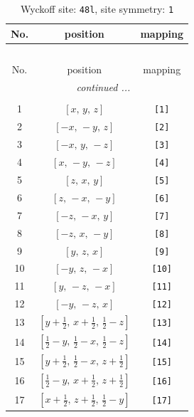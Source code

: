 \documentclass[fleqn,8pt]{jsarticle}
\begin{document}
\begin{longtable}{ccc}
\caption{Wyckoff site: {\tt 48l}, site symmetry: {\tt 1}}
 \\
 \hline \hline
No. & position & mapping \\ \hline \endfirsthead

\multicolumn{2}{l}{\tablename\ \thetable{}} \\
 \hline \hline
No. & position & mapping \\ \hline \endhead

 \hline \hline
\multicolumn{2}{r}{\footnotesize\it continued ...} \\ \endfoot

 \hline \hline
\multicolumn{2}{r}{} \\ \endlastfoot

1 & $\left[ x,\, y,\, z \right]$ & {\tt [1]} \\ \hline
2 & $\left[ - x,\, - y,\, z \right]$ & {\tt [2]} \\ \hline
3 & $\left[ - x,\, y,\, - z \right]$ & {\tt [3]} \\ \hline
4 & $\left[ x,\, - y,\, - z \right]$ & {\tt [4]} \\ \hline
5 & $\left[ z,\, x,\, y \right]$ & {\tt [5]} \\ \hline
6 & $\left[ z,\, - x,\, - y \right]$ & {\tt [6]} \\ \hline
7 & $\left[ - z,\, - x,\, y \right]$ & {\tt [7]} \\ \hline
8 & $\left[ - z,\, x,\, - y \right]$ & {\tt [8]} \\ \hline
9 & $\left[ y,\, z,\, x \right]$ & {\tt [9]} \\ \hline
10 & $\left[ - y,\, z,\, - x \right]$ & {\tt [10]} \\ \hline
11 & $\left[ y,\, - z,\, - x \right]$ & {\tt [11]} \\ \hline
12 & $\left[ - y,\, - z,\, x \right]$ & {\tt [12]} \\ \hline
13 & $\left[ y + \frac{1}{2},\, x + \frac{1}{2},\, \frac{1}{2} - z \right]$ & {\tt [13]} \\ \hline
14 & $\left[ \frac{1}{2} - y,\, \frac{1}{2} - x,\, \frac{1}{2} - z \right]$ & {\tt [14]} \\ \hline
15 & $\left[ y + \frac{1}{2},\, \frac{1}{2} - x,\, z + \frac{1}{2} \right]$ & {\tt [15]} \\ \hline
16 & $\left[ \frac{1}{2} - y,\, x + \frac{1}{2},\, z + \frac{1}{2} \right]$ & {\tt [16]} \\ \hline
17 & $\left[ x + \frac{1}{2},\, z + \frac{1}{2},\, \frac{1}{2} - y \right]$ & {\tt [17]} \\ \hline

\end{longtable}
\end{document}
